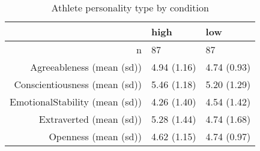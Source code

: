 \begin{table}[ht]
\centering
\begin{tabular}{rll}
  \hline
 & high & low \\ 
  \hline
n &   87 &   87 \\ 
  Agreeableness (mean (sd)) & 4.94 (1.16) & 4.74 (0.93) \\ 
  Conscientiousness (mean (sd)) & 5.46 (1.18) & 5.20 (1.29) \\ 
  EmotionalStability (mean (sd)) & 4.26 (1.40) & 4.54 (1.42) \\ 
  Extraverted (mean (sd)) & 5.28 (1.44) & 4.74 (1.68) \\ 
  Openness (mean (sd)) & 4.62 (1.15) & 4.74 (0.97) \\ 
   \hline
\end{tabular}
\caption{Athlete personality type by condition} 
\end{table}
